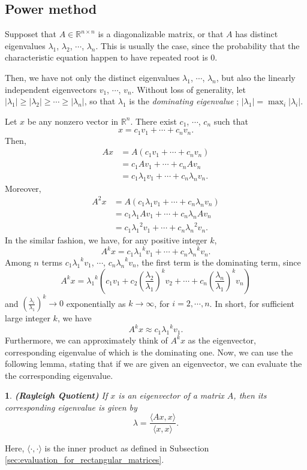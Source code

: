 \documentclass[12pt]{report}
\numberwithin{figure}{chapter}
\theoremstyle{plain}
\theoremstyle{definition}
\theoremstyle{corollary}
\theoremstyle{definition}
\theoremstyle{plain}
\theoremstyle{definition}
\theoremstyle{plain}
\newtheorem{lemma}[theorem]{\protect\lemmaname}
\providecommand{\lemmaname}{Lemma}
\begin{document}
\subsection{Power method}\label{sec:power_method}
Supposet that \(A\in\mathbb R^{n\times n}\) is a diagonalizable matrix, or that \(A\) has distinct eigenvalues \(\lambda_1\), \(\lambda_2\), \(\cdots\), \(\lambda_n\).
This is usually the case, since the probability that the characteristic equation happen to have repeated root is 0.

Then, we have not only the distinct eigenvalues \(\lambda_1\), \(\cdots\), \(\lambda_n\), but also the linearly independent eigenvectors \(v_1\), \(\cdots\), \(v_n\).
Without loss of generality, let \(|\lambda_1|\ge|\lambda_2|\ge\cdots\ge|\lambda_n|\), so that \(\lambda_1\) is the \emph{dominating eigenvalue} ; \(|\lambda_1|=\max_i|\lambda_i|\).

Let \(x\) be any nonzero vector in \(\mathbb R^n\).
There exist \(c_1\), \(\cdots\), \(c_n\) such that
\[x=c_1v_1+\cdots+c_nv_n.\]
Then,
\begin{align*}
Ax
&=A(c_1v_1+\cdots+c_nv_n)\\
&=c_1Av_1+\cdots+c_nAv_n\\
&=c_1\lambda_1v_1+\cdots+c_n\lambda_nv_n.
\end{align*}
Moreover,
\begin{align*}
A^2x
&=A(c_1\lambda_1v_1+\cdots+c_n\lambda_nv_n)\\
&=c_1\lambda_1Av_1+\cdots+c_n\lambda_nAv_n\\
&=c_1{\lambda_1}^2v_1+\cdots+c_n{\lambda_n}^2v_n.
\end{align*}
In the similar fashion, we have, for any positive integer \(k\),
\[A^kx=c_1{\lambda_1}^kv_1+\cdots+c_n{\lambda_n}^kv_n.\]
Among \(n\) terms \(c_1{\lambda_1}^kv_1\), \(\cdots\), \(c_n{\lambda_n}^kv_n\), the first term is the dominating term, since
\[A^kx={\lambda_1}^k\left(c_1v_1+c_2\left(\frac{\lambda_2}{\lambda_1}\right)^kv_2+\cdots+c_n\left(\frac{\lambda_n}{\lambda_1}\right)^kv_n\right)\]
and
\(\left(\frac{\lambda_i}{\lambda_1}\right)^k\to0\) exponentially as \(k\to\infty\), for \(i=2,\cdots,n\).
In short, for sufficient large integer \(k\), we have
\[A^kx\approx c_1{\lambda_1}^kv_1.\]
Furthermore, we can approximately think of \(A^kx\) as the eigenvector, corresponding eigenvalue of which is the dominating one.
Now, we can use the following lemma, stating that if we are given an eigenvector, we can evaluate the the corresponding eigenvalue.

\begin{lemma}\label{lemm:Rayleigh}
\textbf{(Rayleigh Quotient)}
If \(x\) is an eigenvector of a matrix \(A\), then its corresponding eigenvalue is given by
\[\lambda = \frac{\langle Ax,x\rangle}{\langle x,x\rangle}.\]
\end{lemma}
Here, \(\langle\cdot,\cdot\rangle\) is the inner product as defined in Subsection \ref{sec:evaluation_for_rectangular_matrices}.
\end{document}
